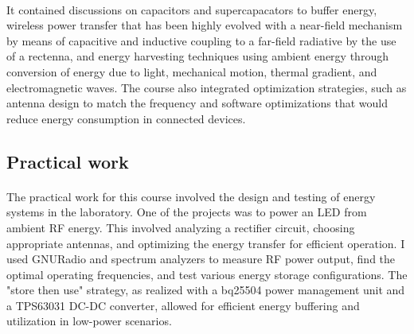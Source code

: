 \paragraph{}It contained discussions on capacitors and supercapacators to buffer energy, wireless power transfer that has been highly evolved with a near-field mechanism by means of capacitive and inductive coupling to a far-field radiative by the use of a rectenna, and energy harvesting techniques using ambient energy through conversion of energy due to light, mechanical motion, thermal gradient, and electromagnetic waves. The course also integrated optimization strategies, such as antenna design to match the frequency and software optimizations that would reduce energy consumption in connected devices.

\subsection{Practical work}

\paragraph{}The practical work for this course involved the design and testing of energy systems in the laboratory. One of the projects was to power an LED from ambient RF energy. This involved analyzing a rectifier circuit, choosing appropriate antennas, and optimizing the energy transfer for efficient operation. I used GNURadio and spectrum analyzers to measure RF power output, find the optimal operating frequencies, and test various energy storage configurations. The "store then use" strategy, as realized with a bq25504 power management unit and a TPS63031 DC-DC converter, allowed for efficient energy buffering and utilization in low-power scenarios.

